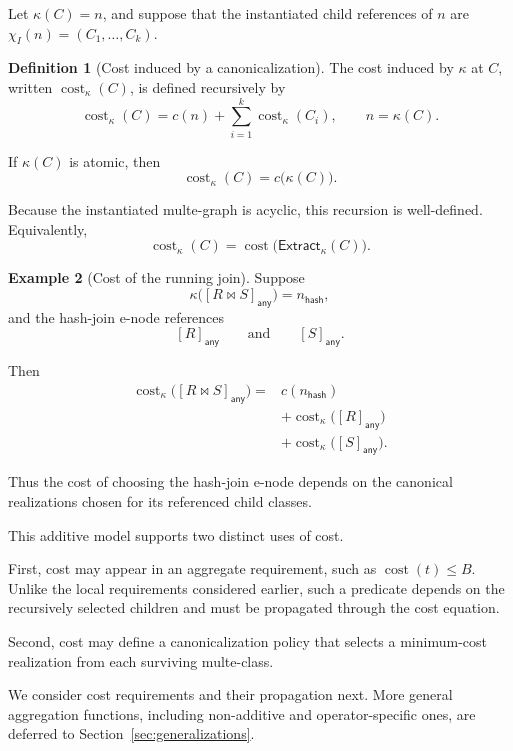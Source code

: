\documentclass[sigconf,nonacm]{acmart}
\theoremstyle{definition}
\newtheorem{definition}{Definition}[section]
\newtheorem{example}[definition]{Example}
\theoremstyle{plain}
\theoremstyle{remark}
\begin{document}
Let \(\kappa(C)=n\),
and suppose that the instantiated child references of \(n\) are
\(\chi_I(n)=(C_1,\ldots,C_k)\).

\begin{definition}[Cost induced by a canonicalization]
The cost induced by \(\kappa\) at \(C\), written
\(\operatorname{cost}_{\kappa}(C)\),
is defined recursively by
\[
\operatorname{cost}_{\kappa}(C)
=
c(n)
+
\sum_{i=1}^{k}
\operatorname{cost}_{\kappa}(C_i),
\qquad
n=\kappa(C).
\]

If \(\kappa(C)\) is atomic, then
\[
\operatorname{cost}_{\kappa}(C)
=
c\bigl(\kappa(C)\bigr).
\]
\end{definition}

Because the instantiated multe-graph is acyclic, this recursion is
well-defined.  Equivalently,
\[
\operatorname{cost}_{\kappa}(C)
=
\operatorname{cost}
\bigl(
\mathsf{Extract}_{\kappa}(C)
\bigr).
\]

\begin{example}[Cost of the running join]
Suppose
\[
\kappa\bigl([R\Join S]_{\mathsf{any}}\bigr)
=
n_{\mathsf{hash}},
\]
and the hash-join e-node references
\[
[R]_{\mathsf{any}}
\qquad\text{and}\qquad
[S]_{\mathsf{any}}.
\]

Then
\[
\begin{split}
\operatorname{cost}_{\kappa}
\bigl([R\Join S]_{\mathsf{any}}\bigr)
={}&
c(n_{\mathsf{hash}})
\\
&+
\operatorname{cost}_{\kappa}
\bigl([R]_{\mathsf{any}}\bigr)
\\
&+
\operatorname{cost}_{\kappa}
\bigl([S]_{\mathsf{any}}\bigr).
\end{split}
\]

Thus the cost of choosing the hash-join e-node depends on the
canonical realizations chosen for its referenced child classes.
\end{example}

This additive model supports two distinct uses of cost.

First, cost may appear in an aggregate requirement, such as
\(\operatorname{cost}(t)\leq B\).
Unlike the local requirements considered earlier, such a predicate
depends on the recursively selected children and must be propagated
through the cost equation.

Second, cost may define a canonicalization policy that selects a
minimum-cost realization from each surviving multe-class.

We consider cost requirements and their propagation next.  More general
aggregation functions, including non-additive and operator-specific
ones, are deferred to Section~\ref{sec:generalizations}.
\end{document}
